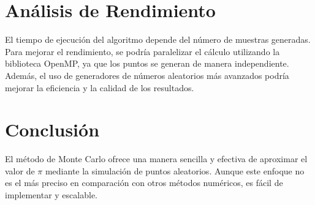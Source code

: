 \documentclass[a4paper, 10pt]{IEEEtran}
\begin{document}
\section{Análisis de Rendimiento}
El tiempo de ejecución del algoritmo depende del número de muestras generadas. Para mejorar el rendimiento, se podría paralelizar el cálculo utilizando la biblioteca OpenMP, ya que los puntos se generan de manera independiente. Además, el uso de generadores de números aleatorios más avanzados podría mejorar la eficiencia y la calidad de los resultados.

\section{Conclusión}
El método de Monte Carlo ofrece una manera sencilla y efectiva de aproximar el valor de $\pi$ mediante la simulación de puntos aleatorios. Aunque este enfoque no es el más preciso en comparación con otros métodos numéricos, es fácil de implementar y escalable.
\end{document}
